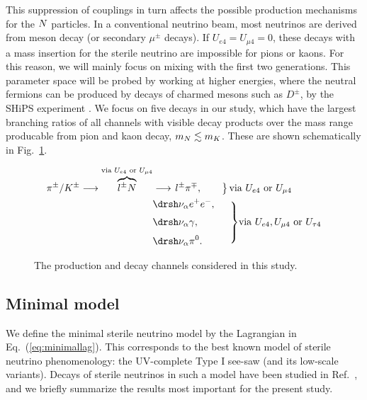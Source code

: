 \documentclass[11pt, a4paper]{article}
\newcommand{\refeq}[1]{Eq.~(\ref{#1})}
\newcommand{\reffig}[1]{Fig.~\ref{#1}}
\newcommand{\refref}[1]{Ref.~\cite{#1}}
\def\ster{\ensuremath N}
\begin{document}
This suppression of couplings in turn affects the possible production
mechanisms for the $\ster$ particles. In a conventional neutrino beam, most
neutrinos are derived from meson decay (or secondary $\mu^\pm$ decays). If
$U_{e4}=U_{\mu 4}=0$, these decays with a mass insertion for the sterile
neutrino are impossible for pions or kaons. For this reason, we will mainly
focus on mixing with the first two generations. This parameter space will be
probed by working at higher energies, where the neutral fermions can be
produced by decays of charmed mesons such as $D^\pm$, by the SHiPS experiment
\cite{Alekhin:2015byh, Anelli:2015pba}.   
%
We focus on five decays in our study, which have the largest branching ratios
of all channels with visible decay products over the mass range producable from
pion and kaon decay, $m_{\ster} \lesssim m_K$. These are shown schematically in
\reffig{fig:decaydiagrams}.

\begin{figure}[t]
\begin{align*}
\pi^\pm / K^\pm \longrightarrow \overbrace{l^\pm \ster}^{\text{via } U_{e4} \text{ or } U_{\mu 4}}  &\longrightarrow \left. l^\pm \pi^\mp, \qquad \right\} \text{via } U_{e4} \text{ or } U_{\mu 4}\\
														    & \drsh \nu_\alpha e^+ e^-,\\[\jot]
					   & \drsh \nu_\alpha \gamma, \hspace*{3em}
		\smash{\left.\begin{array}{@{}c@{}}\\[\jot]\\[\jot]\\[\jot]\end{array}\right\}}\text{via } U_{e4}, U_{\mu 4} \text{  or  } U_{\tau 4}\\[\jot]
						& \drsh \nu_\alpha \pi^0.
\end{align*}

\caption{\label{fig:decaydiagrams}The production and decay channels considered in this study.}

\end{figure}

\subsection{Minimal model}

We define the minimal sterile neutrino model by the Lagrangian in
\refeq{eq:minimallag}. This corresponds to the best known model of sterile
neutrino phenomenology: the UV-complete Type I see-saw (and its low-scale
variants). Decays of sterile neutrinos in such a model have been studied in
\refref{Atre:2009rg}, and we briefly summarize the results most important for
the present study.
\end{document}
